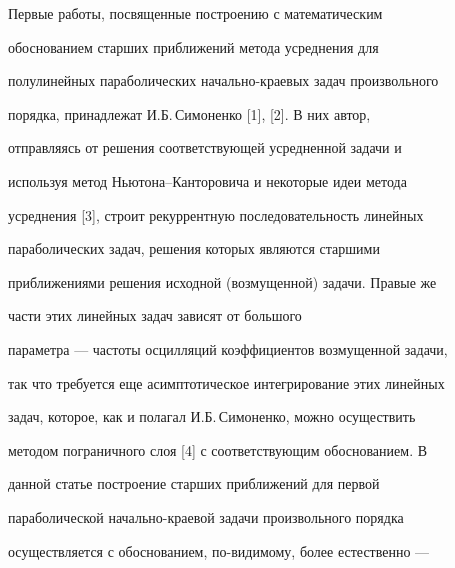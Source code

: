 \date{}




\pagestyle{plain} %







\maketitle


\label{begin}











Первые работы, посвященные построению с математическим


обоснованием старших приближений метода усреднения для


полулинейных параболических начально-краевых задач произвольного


порядка, принадлежат И.Б.\,Симоненко [1], [2]. В них автор,


отправляясь от решения соответствующей усредненной задачи и


используя метод Ньютона--Канторовича и некоторые идеи метода


усреднения [3], строит рекуррентную последовательность линейных


параболических задач, решения которых являются старшими


приближениями решения исходной (возмущенной) задачи. Правые же


части этих линейных задач зависят от большого


параметра --- частоты осцилляций коэффициентов возмущенной задачи,


так что требуется еще асимптотическое интегрирование этих линейных


задач, которое, как и полагал И.Б.\,Симоненко, можно осуществить


методом пограничного слоя [4] с соответствующим обоснованием. В


данной статье построение старших приближений для первой


параболической начально-краевой задачи произвольного порядка


осуществляется с обоснованием, по-видимому, более естественно ---


